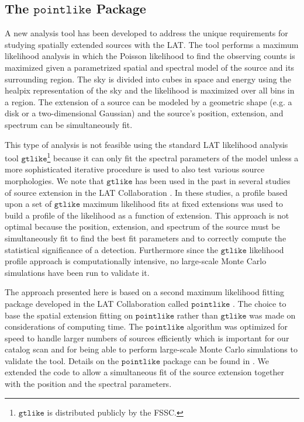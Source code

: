 \documentclass[12pt,preprint]{aastex}
\newcommand{\gtlike}{\ensuremath{\mathtt{gtlike}}\xspace}
\newcommand{\pointlike}{\ensuremath{\mathtt{pointlike}}\xspace}
\begin{document}
\subsection{The \pointlike Package}

A new analysis tool has been developed to address the unique requirements
for studying spatially extended sources with the LAT. The tool performs
a maximum likelihood analysis in which the Poisson likelihood to find
the observing counts is maximized given a parametrized spatial and
spectral model of the source and its surrounding region.  The sky is
divided into cubes in space and energy using the healpix representation
of the sky \citep{healpix} and the likelihood is maximized over all bins
in a region.  The extension of a source can be modeled by a geometric
shape (e.g. a disk or a two-dimensional Gaussian) and the source's position, extension,
and spectrum can be simultaneously fit.

This type of analysis is not feasible using the standard LAT likelihood
analysis tool \gtlike\footnote{\gtlike is distributed publicly by the
FSSC.} because it can only fit the spectral parameters of the model
unless a more sophisticated iterative procedure is used to also test
various source morphologies.  We note that \gtlike has been used in the
past in several studies of source extension in the LAT Collaboration
\citep{lmc,smc,w28,w51c}.  In these studies, a profile based upon a
set of \gtlike maximum likelihood fits at fixed extensions was used
to build a profile of the likelihood as a function of extension.
This approach is not optimal because the position, extension, and
spectrum of the source must be simultaneously fit to find the best fit
parameters and to correctly compute the statistical significance of
a detection.  Furthermore since the \gtlike likelihood profile approach
is computationally intensive, no large-scale Monte Carlo simulations
have been run to validate it.

The approach presented here is based on a second maximum likelihood
fitting package developed in the LAT Collaboration called \pointlike
\citep{first_cat,matthew_kerr_thesis}.  The choice to base the
spatial extension fitting on \pointlike rather than \gtlike was made
on considerations of computing time.  The \pointlike algorithm was
optimized for speed to handle larger numbers of sources efficiently
which is important for our catalog scan and for being able
to perform large-scale Monte Carlo simulations to validate the tool.
Details on the \pointlike package can be
found in \cite{matthew_kerr_thesis}.  We extended the code to allow a
simultaneous fit of the source extension together with the position and
the spectral parameters.
\end{document}
